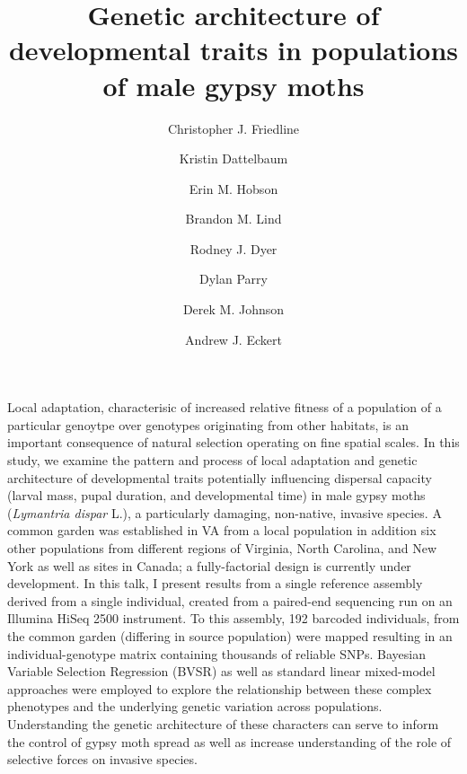 \documentclass{article}
\date{}
\title{Genetic architecture of developmental traits in populations of male gypsy moths}
\author[1]{Christopher J. Friedline}
\author[1,2]{Kristin Dattelbaum}
\author[1]{Erin M. Hobson}
\author[1]{Brandon M. Lind}
\author[1]{Rodney J. Dyer}
\author[3]{Dylan Parry}
\author[1]{Derek M. Johnson}
\author[1]{Andrew J. Eckert}
\affil[1]{Department of Biology, Virginia Commonwealth University}
\affil[2]{Deparment of Biology, University of Richmond}
\affil[3]{College of Environmental Science \& Forestry, State University of New 
York}
\begin{document}
\maketitle

\label{sec:abstract}

Local adaptation, characterisic of increased relative fitness
of a population of a particular genoytpe over genotypes originating from
other habitats, is an important consequence of natural selection
operating on fine spatial scales.  In this study, we examine the
pattern and process of local adaptation and genetic architecture of
developmental traits potentially influencing dispersal capacity
(larval mass, pupal duration, and developmental time) in male gypsy
moths (\textit{Lymantria dispar} L.), a particularly damaging,
non-native, invasive species.  A common garden was established in VA
from a local population in addition six other populations from
different regions of Virginia, North Carolina, and New York as well as
sites in Canada; a fully-factorial design is currently under
development.  In this talk, I present results from a single reference
assembly derived from a single individual, created from a paired-end
sequencing run on an Illumina HiSeq 2500 instrument.  To this
assembly, 192 barcoded individuals, from the common garden (differing
in source population) were mapped resulting in an individual-genotype
matrix containing thousands of reliable SNPs.  Bayesian Variable
Selection Regression (BVSR) as well as standard linear mixed-model
approaches were employed to explore the relationship between these
complex phenotypes and the underlying genetic variation across
populations. Understanding the genetic architecture of these
characters can serve to inform the control of gypsy moth spread as
well as increase understanding of the role of selective forces on
invasive species.
\end{document}
